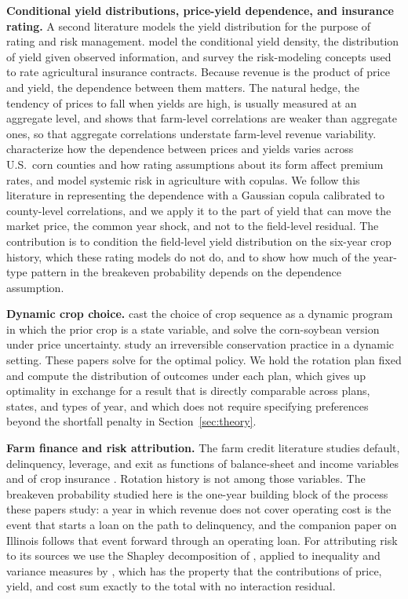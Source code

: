 \documentclass[11pt,letterpaper]{article}
\theoremstyle{remark}
\begin{document}
\textbf{Conditional yield distributions, price-yield dependence, and insurance rating.} A second literature models the yield distribution for the purpose of rating and risk management. \citet{Ker2003} model the conditional yield density, the distribution of yield given observed information, and \citet{Goodwin2004} survey the risk-modeling concepts used to rate agricultural insurance contracts. Because revenue is the product of price and yield, the dependence between them matters. The natural hedge, the tendency of prices to fall when yields are high, is usually measured at an aggregate level, and \citet{Finger2012} shows that farm-level correlations are weaker than aggregate ones, so that aggregate correlations understate farm-level revenue variability. \citet{Ramsey2019} characterize how the dependence between prices and yields varies across U.S.\ corn counties and how rating assumptions about its form affect premium rates, and \citet{Goodwin2015} model systemic risk in agriculture with copulas. We follow this literature in representing the dependence with a Gaussian copula calibrated to county-level correlations, and we apply it to the part of yield that can move the market price, the common year shock, and not to the field-level residual. The contribution is to condition the field-level yield distribution on the six-year crop history, which these rating models do not do, and to show how much of the year-type pattern in the breakeven probability depends on the dependence assumption.

\textbf{Dynamic crop choice.} \citet{Burt1963} cast the choice of crop sequence as a dynamic program in which the prior crop is a state variable, and \citet{Livingston2015} solve the corn-soybean version under price uncertainty. \citet{Chen2025} study an irreversible conservation practice in a dynamic setting. These papers solve for the optimal policy. We hold the rotation plan fixed and compute the distribution of outcomes under each plan, which gives up optimality in exchange for a result that is directly comparable across plans, states, and types of year, and which does not require specifying preferences beyond the shortfall penalty in Section~\ref{sec:theory}.

\textbf{Farm finance and risk attribution.} The farm credit literature studies default, delinquency, leverage, and exit as functions of balance-sheet and income variables and of crop insurance \citep{Featherstone2006, IfftKuethe2013, Ifft2015, Kim2020, LeeEtAl2024}. Rotation history is not among those variables. The breakeven probability studied here is the one-year building block of the process these papers study: a year in which revenue does not cover operating cost is the event that starts a loan on the path to delinquency, and the companion paper on Illinois follows that event forward through an operating loan. For attributing risk to its sources we use the Shapley decomposition of \citet{Shapley1953}, applied to inequality and variance measures by \citet{Shorrocks2013}, which has the property that the contributions of price, yield, and cost sum exactly to the total with no interaction residual.
\end{document}
